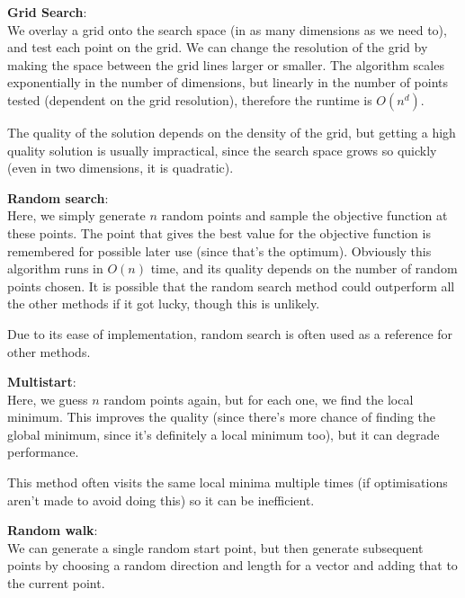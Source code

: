 \begin{description}
  \item \textbf{Grid Search}:\\
  We overlay a grid onto the search space (in as many dimensions as we need to),
  and test each point on the grid. We can change the resolution of the grid by
  making the space between the grid lines larger or smaller. The algorithm
  scales exponentially in the number of dimensions, but linearly in the number
  of points tested (dependent on the grid resolution), therefore the runtime is
  $O(n^d)$.

  The quality of the solution depends on the density of the grid, but getting a
  high quality solution is usually impractical, since the search space grows so
  quickly (even in two dimensions, it is quadratic).

  \item \textbf{Random search}:\\
  Here, we simply generate $n$ random points and sample the objective function
  at these points. The point that gives the best value for the objective
  function is remembered for possible later use (since that's the optimum).
  Obviously this algorithm runs in $O(n)$ time, and its quality depends on the
  number of random points chosen. It is possible that the random search method
  could outperform all the other methods if it got lucky, though this is
  unlikely.

  Due to its ease of implementation, random search is often used as a reference
  for other methods.

  \item \textbf{Multistart}:\\

  Here, we guess $n$ random points again, but for each one, we find the local
  minimum. This improves the quality (since there's more chance of finding the
  global minimum, since it's definitely a local minimum too), but it can degrade
  performance.

  This method often visits the same local minima multiple times (if
  optimisations aren't made to avoid doing this) so it can be inefficient.

  \item \textbf{Random walk}:\\
  We can generate a single random start point, but then generate subsequent
  points by choosing a random direction and length for a vector and adding that
  to the current point.


\end{description}
